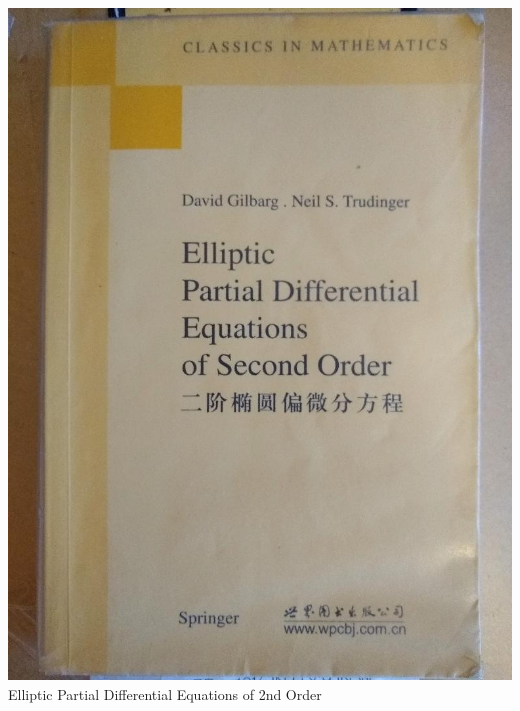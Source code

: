 \documentclass[t]{beamer}
\newcommand{\htarget}[2]{\hypertarget{#1}{#2}}
\begin{document}
\begin{frame}\htarget{ePDE}{} \begin{center}
\includegraphics[height=0.8\textheight]{Elliptic_Partial_Differential_Equations_of_2nd_order_mini.jpg} \\
Elliptic Partial Differential Equations of 2nd Order
\end{center} \end{frame}
\end{document}
